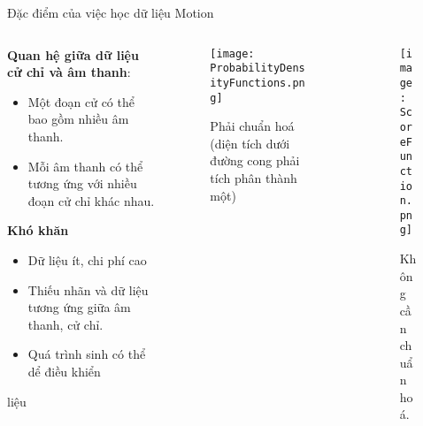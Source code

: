 \begin{frame}{Đặc điểm của việc học dữ liệu Motion}
	
	\begin{columns}
		\begin{column}{0.55\textwidth}
			\textbf{Quan hệ giữa dữ liệu cử chỉ và âm thanh}:
			\begin{itemize}
				\item Một đoạn cử có thể bao gồm nhiều âm thanh.
				\item Mỗi âm thanh có thể tương ứng với nhiều đoạn cử chỉ khác nhau.
			\end{itemize}
			\textbf{Khó khăn}
			\begin{itemize}
				\item Dữ liệu ít, chi phí cao
				\item Thiếu nhãn và dữ liệu tương ứng giữa âm thanh, cử chỉ.
				\item Quá trình sinh có thể dể điều khiển 
			\end{itemize}
			liệu
		\end{column}
		\begin{column}{0.45\textwidth}
			
			\begin{columns}
				\begin{column}{0.5\textwidth}
					\begin{figure}
						\texttt{[image: ProbabilityDensityFunctions.png]}
						\caption{\scriptsize Phải chuẩn hoá (diện tích dưới đường cong phải tích phân thành một)}
					\end{figure}
				\end{column}
				\begin{column}{0.5\textwidth}
					\begin{figure}
						\texttt{[image: ScoreFunction.png]}
						\caption{\scriptsize Không cần chuẩn hoá.}
					\end{figure}
				\end{column}
			\end{columns}
			

\end{column}
\end{columns}
\end{frame}
